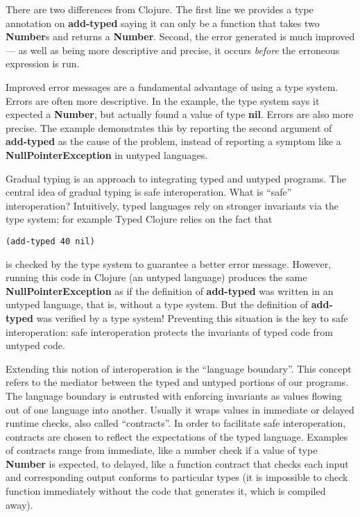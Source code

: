 \documentclass[10pt]{article}
\begin{document}
There are two differences from Clojure.
The first line we provides a type annotation on \textbf{add-typed}
saying it can only be a function that takes two \textbf{Number}s and returns a
\textbf{Number}.
Second, the error generated is much improved --- as well as being more descriptive
and precise, it occurs \emph{before} the erroneous expression is run.

Improved error messages are a fundamental advantage of using a type system.
Errors are often more descriptive.
In the example, the type system says it expected a \textbf{Number}, but
actually found a value of type \textbf{nil}.
Errors are also more precise.
The example demonstrates this by reporting the second argument of \textbf{add-typed}
as the cause of the problem, instead of reporting a symptom like a \textbf{NullPointerException}
in untyped languages.

Gradual typing is an approach to integrating typed and untyped programs.
The central idea of gradual typing is safe interoperation.
What is ``safe'' interoperation?
Intuitively, typed languages rely on stronger invariants via the type system; for example
Typed Clojure relies on the fact that \begin{verbatim}(add-typed 40 nil)\end{verbatim}
is checked by the type system to guarantee a better error message.
However, running this code in Clojure (an untyped language)
produces the same \textbf{NullPointerException} as if the definition of \textbf{add-typed} was written
in an untyped language, that is, without a type system.
But the definition of \textbf{add-typed} was verified by a type system!
Preventing this situation is the key to safe interoperation: safe interoperation protects the
invariants of typed code from untyped code.

Extending this notion of interoperation is the ``language boundary''.
This concept refers to the mediator between the typed and untyped portions of our programs.
The language boundary is entrusted with enforcing invariants as values flowing out of one language into another.
Usually it wraps values in immediate or delayed runtime checks, also called ``contracts''.
In order to facilitate safe interoperation,
contracts are chosen to reflect the expectations of the typed language.
Examples of contracts range from immediate, like a number check if a value of type \textbf{Number} is expected,
to delayed, like a function contract that checks each input and corresponding output conforms to particular types (it
is impossible to check function immediately without the code that generates it, which is compiled away).
\end{document}
